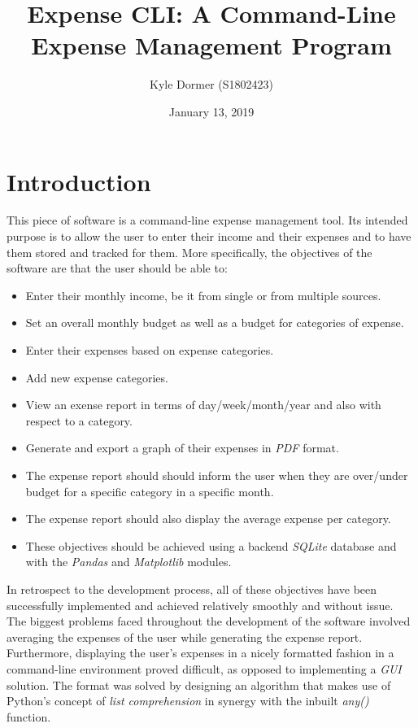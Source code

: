 \documentclass[12pt]{article}
\title{Expense CLI: A Command-Line Expense Management Program}
\author{Kyle Dormer (S1802423)}
\date{January 13, 2019}
\begin{document}
  \maketitle
  \tableofcontents
  \newpage

  \section{Introduction}
  This piece of software is a command-line expense management tool. Its intended purpose is to allow the user to enter their income and their expenses and to have them stored and tracked for them. More specifically, the objectives of the software are that the user should be able to:
  \begin{itemize}
    \item Enter their monthly income, be it from single or from multiple sources.
    \item Set an overall monthly budget as well as a budget for categories of expense.
    \item Enter their expenses based on expense categories.
    \item Add new expense categories.
    \item View an exense report in terms of day/week/month/year and also with respect to a category.
    \item Generate and export a graph of their expenses in \textit{PDF} format.
    \item The expense report should should inform the user when they are over/under budget for a specific category in a specific month.
    \item The expense report should also display the average expense per category.
    \item These objectives should be achieved using a backend \textit{SQLite} database and with the \textit{Pandas} and \textit{Matplotlib} modules.
  \end{itemize}
  In retrospect to the development process, all of these objectives have been successfully implemented and achieved relatively smoothly and without issue. The biggest problems faced throughout the development of the software involved averaging the expenses of the user while generating the expense report. Furthermore, displaying the user's expenses in a nicely formatted fashion in a command-line environment proved difficult, as opposed to implementing a \textit{GUI} solution. The format was solved by designing an algorithm that makes use of Python's concept of \textit{list comprehension} in synergy with the inbuilt \textit{any()} function.
\end{document}
